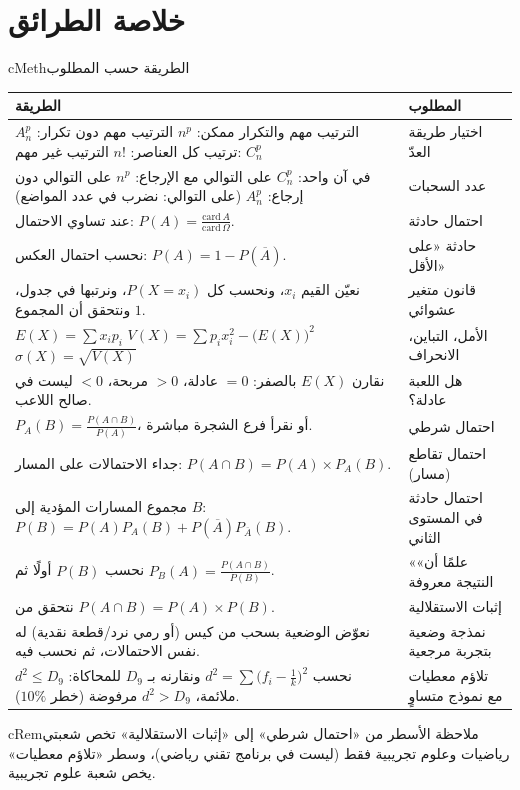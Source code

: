 \documentclass[12pt,a4paper]{article}
\newenvironment{BOX}[2]{\begin{otherlanguage}{english}\begin{arbox}{#1}{#2}}{\end{arbox}\end{otherlanguage}}
\newenvironment{molahada}[1][ملاحظة]{\begin{BOX}{cRem}{#1}}{\end{BOX}}
\begin{document}
\section{خلاصة الطرائق}
\begin{BOX}{cMeth}{الطريقة حسب المطلوب}
\begin{center}
\renewcommand{\arraystretch}{1.5}
\begin{tabular}{|p{}|p{}|}\hline
\rowcolor{cSec!12} \textbf{الطريقة} & \textbf{المطلوب}\\\hline
الترتيب مهم والتكرار ممكن: $n^p$ \newline الترتيب مهم دون تكرار: $A_n^p$ \newline ترتيب كل العناصر: $n!$ \newline الترتيب غير مهم: $C_n^p$ & اختيار طريقة العدّ\\\hline
في آن واحد: $C_n^p$ \newline على التوالي مع الإرجاع: $n^p$ \newline على التوالي دون إرجاع: $A_n^p$ \newline (على التوالي: نضرب في عدد المواضع) & عدد السحبات\\\hline
عند تساوي الاحتمال: $P(A)=\frac{\mathrm{card}\,A}{\mathrm{card}\,\Omega}$. & احتمال حادثة\\\hline
نحسب احتمال العكس: $P(A)=1-P(\overline{A})$. & حادثة «على الأقل»\\\hline
نعيّن القيم $x_i$، ونحسب كل $P(X=x_i)$، ونرتبها في جدول، ونتحقق أن المجموع $1$. & قانون متغير عشوائي\\\hline
$E(X)=\sum x_ip_i$ \newline $V(X)=\sum p_ix_i^2-\big(E(X)\big)^2$ \newline $\sigma(X)=\sqrt{V(X)}$ & الأمل، التباين، الانحراف\\\hline
نقارن $E(X)$ بالصفر: $=0$ عادلة، $>0$ مربحة، $<0$ ليست في صالح اللاعب. & هل اللعبة عادلة؟\\\hline
$P_A(B)=\frac{P(A\cap B)}{P(A)}$، أو نقرأ فرع الشجرة مباشرة. & احتمال شرطي\\\hline
جداء الاحتمالات على المسار: $P(A\cap B)=P(A)\times P_A(B)$. & احتمال تقاطع (مسار)\\\hline
مجموع المسارات المؤدية إلى $B$: $P(B)=P(A)P_A(B)+P(\overline{A})P_{\overline{A}}(B)$. & احتمال حادثة في المستوى الثاني\\\hline
نحسب $P(B)$ أولًا ثم $P_B(A)=\frac{P(A\cap B)}{P(B)}$. & «علمًا أن» النتيجة معروفة\\\hline
نتحقق من $P(A\cap B)=P(A)\times P(B)$. & إثبات الاستقلالية\\\hline
نعوّض الوضعية بسحب من كيس (أو رمي نرد/قطعة نقدية) له نفس الاحتمالات، ثم نحسب فيه. & نمذجة وضعية بتجربة مرجعية\\\hline
نحسب $d^2=\sum\big(f_i-\frac1k\big)^2$ ونقارنه بـ $D_9$ للمحاكاة: $d^2\leqslant D_9$ ملائمة، $d^2>D_9$ مرفوضة (خطر $10\%$). & تلاؤم معطيات مع نموذج متساوٍ\\\hline
\end{tabular}
\end{center}
\end{BOX}
\begin{molahada}
الأسطر من «احتمال شرطي» إلى «إثبات الاستقلالية» تخص شعبتي رياضيات وعلوم تجريبية فقط (ليست في برنامج تقني رياضي)، وسطر «تلاؤم معطيات» يخص شعبة علوم تجريبية.
\end{molahada}
\end{document}
